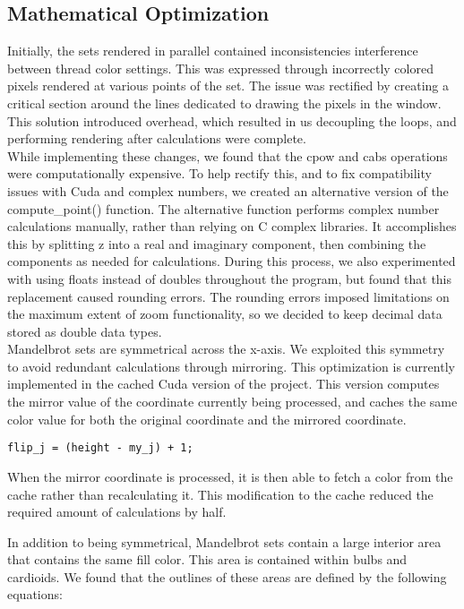 \documentclass{article}
\begin{document}
\subsection{Mathematical Optimization}

Initially, the sets rendered in parallel contained inconsistencies interference between thread color settings. This was expressed through incorrectly colored pixels rendered at various points of the set. The issue was rectified by creating a critical section around the lines dedicated to drawing the pixels in the window. This solution introduced overhead, which resulted in us decoupling the loops, and performing rendering after calculations were complete. \\

While implementing these changes, we found that the cpow and cabs operations were computationally expensive. To help rectify this, and to fix compatibility issues with Cuda and complex numbers, we created an alternative version of the compute\_point() function. The alternative function performs complex number calculations manually, rather than relying on C complex libraries. It accomplishes this by splitting z into a real and imaginary component, then combining the components as needed for calculations. During this process, we also experimented with using floats instead of doubles throughout the program, but found that this replacement caused rounding errors. The rounding errors imposed limitations on the maximum extent of zoom functionality, so we decided to keep decimal data stored as double data types.\\

Mandelbrot sets are symmetrical across the x-axis. We exploited this symmetry to avoid redundant calculations through mirroring. This optimization is currently implemented in the cached Cuda version of the project. This version computes the mirror value of the coordinate currently being processed, and caches the same color value for both the original coordinate and the mirrored coordinate.

\begin{verbatim}
flip_j = (height - my_j) + 1;
\end{verbatim}

When the mirror coordinate is processed, it is then able to fetch a color from the cache rather than recalculating it. This modification to the cache reduced the required amount of calculations by half.

In addition to being symmetrical, Mandelbrot sets contain a large interior area that contains the same fill color. This area is contained within bulbs and cardioids. We found that the outlines of these areas are defined by the following equations:
\end{document}
